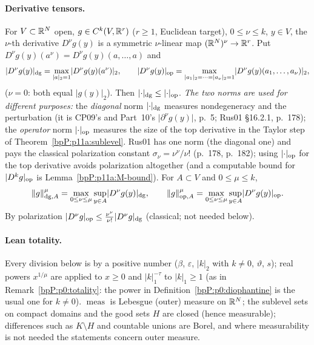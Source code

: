 \paragraph{Derivative tensors.} For $V\subset\mathbb{R}^N$ open, $g\in C^k(V,\mathbb{R}^{r})$ ($r\ge1$, Euclidean target), $0\le\nu\le k$, $y\in V$, the $\nu$-th derivative $D^\nu g(y)$ is a symmetric $\nu$-linear map $(\mathbb{R}^N)^\nu\to\mathbb{R}^r$. Put $D^\nu g(y)(a^\nu)=D^\nu g(y)(a,\dots,a)$ and
\[\lvert D^\nu g(y)\rvert_{\mathrm{dg}}=\max_{\lvert a\rvert_2=1}\lvert D^\nu g(y)(a^\nu)\rvert_2,\qquad \lvert D^\nu g(y)\rvert_{\mathrm{op}}=\max_{\lvert a_1\rvert_2=\dots=\lvert a_\nu\rvert_2=1}\lvert D^\nu g(y)(a_1,\dots,a_\nu)\rvert_2,\]
($\nu=0$: both equal $\lvert g(y)\rvert_2$). Then $\lvert \cdot\rvert_{\mathrm{dg}}\le\lvert \cdot\rvert_{\mathrm{op}}$. \emph{The two norms are used for different purposes:} the \emph{diagonal} norm $\lvert \cdot\rvert_{\mathrm{dg}}$ measures nondegeneracy and the perturbation (it is CP09's and Part~10's $\lvert\partial^\nu g(y)\rvert$, p.~5; Rus01 \S16.2.1, p.~178); the \emph{operator} norm $\lvert \cdot\rvert_{\mathrm{op}}$ measures the size of the top derivative in the Taylor step of Theorem~\ref{bpP:p11a:sublevel}. Rus01 has one norm (the diagonal one) and pays the classical polarization constant $\sigma_\nu=\nu^\nu/\nu!$ (p.~178, p.~182); using $\lvert \cdot\rvert_{\mathrm{op}}$ for the top derivative avoids polarization altogether (and a computable bound for $\lvert D^kg\rvert_{\mathrm{op}}$ is Lemma~\ref{bpP:p11a:M-bound}). For $A\subset V$ and $0\le\mu\le k$,
\[\lVert g\rVert^{\mu}_{\mathrm{dg},A}=\max_{0\le\nu\le\mu}\sup_{y\in A}\lvert D^\nu g(y)\rvert_{\mathrm{dg}},\qquad \lVert g\rVert^{\mu}_{\mathrm{op},A}=\max_{0\le\nu\le\mu}\sup_{y\in A}\lvert D^\nu g(y)\rvert_{\mathrm{op}}.\]
By polarization $\lvert D^\nu g\rvert_{\mathrm{op}}\le\frac{\nu^\nu}{\nu!}\lvert D^\nu g\rvert_{\mathrm{dg}}$ (classical; not needed below).

\paragraph{Lean totality.} Every division below is by a positive number ($\beta$, $\varepsilon$, $\lvert k\rvert_2$ with $k\ne0$, $\vartheta$, $s$); real powers $x^{1/\mu}$ are applied to $x\ge0$ and $\lvert k\rvert_1^{-\tau}$ to $\lvert k\rvert_1\ge1$ (as in Remark~\ref{bpP:p0:totality}: the power in Definition~\ref{bpP:p0:diophantine} is the usual one for $k\ne0$). $\operatorname{meas}$ is Lebesgue (outer) measure on $\mathbb{R}^N$; the sublevel sets on compact domains and the good sets $H$ are closed (hence measurable); differences such as $K\setminus H$ and countable unions are Borel, and where measurability is not needed the statements concern outer measure.

